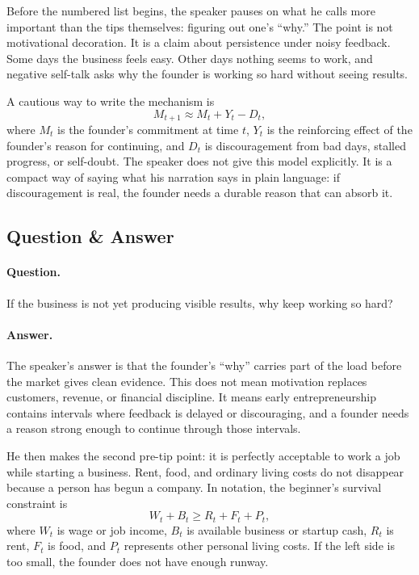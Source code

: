 Before the numbered list begins, the speaker pauses on what he calls more important than the tips themselves: figuring out one's ``why.'' The point is not motivational decoration. It is a claim about persistence under noisy feedback. Some days the business feels easy. Other days nothing seems to work, and negative self-talk asks why the founder is working so hard without seeing results.

A cautious way to write the mechanism is
\[
M_{t+1} \approx M_t + Y_t - D_t,
\]
where \(M_t\) is the founder's commitment at time \(t\), \(Y_t\) is the reinforcing effect of the founder's reason for continuing, and \(D_t\) is discouragement from bad days, stalled progress, or self-doubt. The speaker does not give this model explicitly. It is a compact way of saying what his narration says in plain language: if discouragement is real, the founder needs a durable reason that can absorb it.

\subsection{Question \& Answer}

\paragraph{Question.}
If the business is not yet producing visible results, why keep working so hard?

\paragraph{Answer.}
The speaker's answer is that the founder's ``why'' carries part of the load before the market gives clean evidence. This does not mean motivation replaces customers, revenue, or financial discipline. It means early entrepreneurship contains intervals where feedback is delayed or discouraging, and a founder needs a reason strong enough to continue through those intervals.

He then makes the second pre-tip point: it is perfectly acceptable to work a job while starting a business. Rent, food, and ordinary living costs do not disappear because a person has begun a company. In notation, the beginner's survival constraint is
\[
W_t + B_t \geq R_t + F_t + P_t,
\]
where \(W_t\) is wage or job income, \(B_t\) is available business or startup cash, \(R_t\) is rent, \(F_t\) is food, and \(P_t\) represents other personal living costs. If the left side is too small, the founder does not have enough runway.

